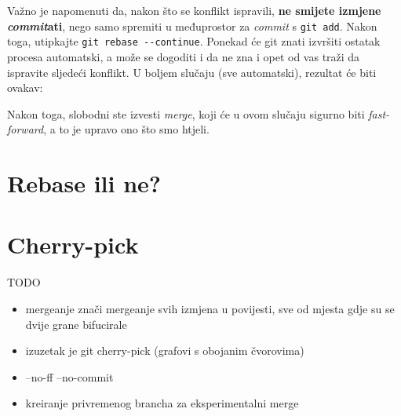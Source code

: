 

Važno je napomenuti da, nakon što se konflikt ispravili, \textbf{ne smijete izmjene \emph{commit}ati}, nego samo spremiti u međuprostor za \emph{commit} s \verb+git add+.
Nakon toga, utipkajte \verb+git rebase --continue+.
Ponekad će git znati izvršiti ostatak procesa automatski, a može se dogoditi i da ne zna i opet od vas traži da ispravite sljedeći konflikt.
U boljem slučaju (sve automatski), rezultat će biti ovakav:



Nakon toga, slobodni ste izvesti \emph{merge}, koji će u ovom slučaju sigurno biti \emph{fast-forward}, a to je upravo ono što smo htjeli.

\section*{Rebase ili ne?}


\section*{Cherry-pick}

TODO

\begin{itemize}
   \item mergeanje znači mergeanje svih izmjena u povijesti, sve od mjesta gdje su se dvije grane bifucirale
   \item izuzetak je git cherry-pick (grafovi s obojanim čvorovima)
   \item --no-ff --no-commit
   \item kreiranje privremenog brancha za eksperimentalni merge
\end{itemize}


